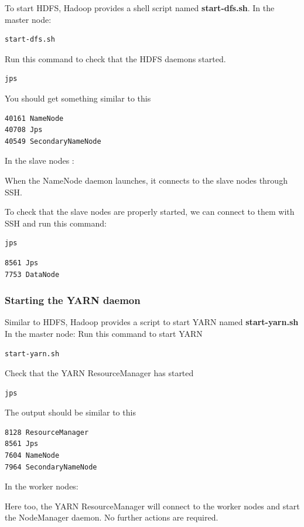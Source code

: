 \documentclass[12pt,english]{book}
\begin{document}
To start HDFS, Hadoop provides a shell script named \textbf{start-dfs.sh}.
In the master node:
\begin{lstlisting}[language=bash, frame=single]
start-dfs.sh
\end{lstlisting}

Run this command to check that the HDFS daemons started.
\begin{lstlisting}[language=bash, frame=single]
jps
\end{lstlisting}
You should get something similar to this
\begin{lstlisting}[language=bash, frame=single]
40161 NameNode
40708 Jps
40549 SecondaryNameNode
\end{lstlisting}

In the slave nodes :

When the NameNode daemon launches, it connects to the slave nodes through SSH.

To check that the slave nodes are properly started, we can connect to them with SSH and run this command:
\begin{lstlisting}[language=bash, frame=single]
jps
\end{lstlisting}

\begin{lstlisting}[language=bash, frame=single]
8561 Jps
7753 DataNode
\end{lstlisting}

\subsubsection{Starting the YARN daemon}

Similar to HDFS, Hadoop provides a script to start YARN named \textbf{start-yarn.sh}
In the master node:
Run this command to start YARN
\begin{lstlisting}[language=bash, frame=single]
start-yarn.sh
\end{lstlisting}

Check that the YARN ResourceManager has started
\begin{lstlisting}[language=bash, frame=single]
jps
\end{lstlisting}
The output should be similar to this
\begin{lstlisting}[language=bash, frame=single]
8128 ResourceManager
8561 Jps
7604 NameNode
7964 SecondaryNameNode
\end{lstlisting}

In the worker nodes:

Here too, the YARN ResourceManager will connect to the worker nodes and start the NodeManager daemon.
No further actions are required.
\end{document}
